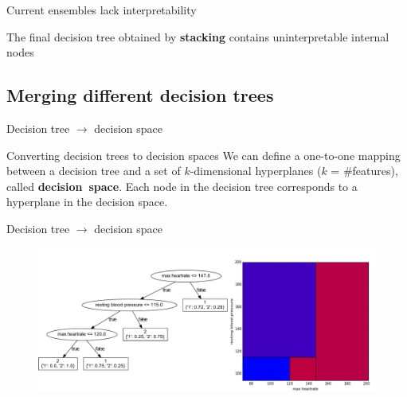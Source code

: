 \documentclass[english]{beamer}
\begin{document}
\begin{frame}{Current ensembles lack interpretability}
	\begin{block}{}
		The final decision tree obtained by \textbf{stacking} contains uninterpretable internal nodes
	\end{block}
	
	\vspace{2em}
	
	
\end{frame}

\subsection*{Merging different decision trees}

\begin{frame}{Decision tree $\rightarrow$ decision space}
	\begin{block}{Converting decision trees to decision spaces}
		We can define a one-to-one mapping between a decision tree and a set of $k$-dimensional hyperplanes ($k$ = $\#$features), called \textbf{decision~space}.	Each node in the decision tree corresponds to a hyperplane in the decision space.
	\end{block}
\end{frame}

\begin{frame}{Decision tree $\rightarrow$ decision space}
	\begin{figure}
		\centering
		\includegraphics[width=\textwidth]{figures/dt_to_space.pdf}
	\end{figure}
\end{frame}
\end{document}
